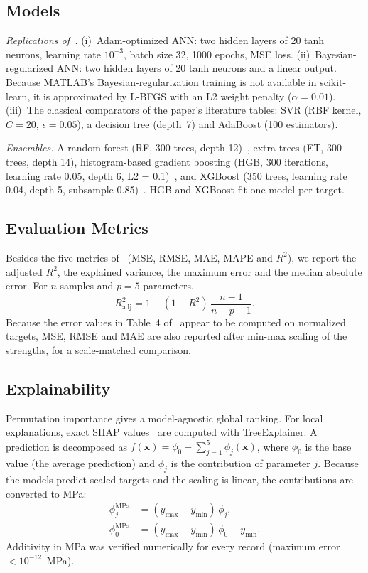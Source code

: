 \documentclass[conference,12pt]{IEEEtran}
\begin{document}
\subsection{Models}
\textit{Replications of~\cite{munshi2026}.} (i)~Adam-optimized ANN: two hidden layers of 20 tanh neurons, learning rate $10^{-3}$, batch size 32, 1000 epochs, MSE loss. (ii)~Bayesian-regularized ANN: two hidden layers of 20 tanh neurons and a linear output. Because MATLAB's Bayesian-regularization training is not available in scikit-learn, it is approximated by L-BFGS with an L2 weight penalty ($\alpha = 0.01$). (iii)~The classical comparators of the paper's literature tables: SVR (RBF kernel, $C = 20$, $\epsilon = 0.05$), a decision tree (depth~7) and AdaBoost (100 estimators).

\textit{Ensembles.} A random forest (RF, 300 trees, depth 12)~\cite{breiman2001}, extra trees (ET, 300 trees, depth 14), histogram-based gradient boosting (HGB, 300 iterations, learning rate 0.05, depth 6, L2 = 0.1)~\cite{ke2017}, and XGBoost (350 trees, learning rate 0.04, depth 5, subsample 0.85)~\cite{chen2016}. HGB and XGBoost fit one model per target.

\subsection{Evaluation Metrics}
Besides the five metrics of~\cite{munshi2026} (MSE, RMSE, MAE, MAPE and $R^2$), we report the adjusted $R^2$, the explained variance, the maximum error and the median absolute error. For $n$ samples and $p = 5$ parameters,
\begin{equation}
R^2_{\mathrm{adj}} = 1 - (1 - R^2)\,\frac{n - 1}{n - p - 1}.
\end{equation}
Because the error values in Table~4 of~\cite{munshi2026} appear to be computed on normalized targets, MSE, RMSE and MAE are also reported after min-max scaling of the strengths, for a scale-matched comparison.

\subsection{Explainability}
Permutation importance gives a model-agnostic global ranking. For local explanations, exact SHAP values~\cite{lundberg2017} are computed with TreeExplainer. A prediction is decomposed as $f(\mathbf{x}) = \phi_0 + \sum_{j=1}^{5} \phi_j(\mathbf{x})$, where $\phi_0$ is the base value (the average prediction) and $\phi_j$ is the contribution of parameter $j$. Because the models predict scaled targets and the scaling is linear, the contributions are converted to MPa:
\begin{align}
\phi_j^{\mathrm{MPa}} &= (y_{\max} - y_{\min})\,\phi_j, \\
\phi_0^{\mathrm{MPa}} &= (y_{\max} - y_{\min})\,\phi_0 + y_{\min}.
\end{align}
Additivity in MPa was verified numerically for every record (maximum error $< 10^{-12}$~MPa).
\end{document}

